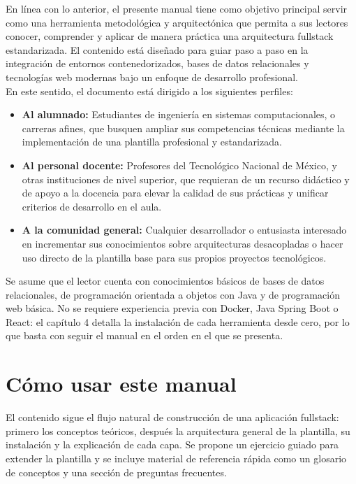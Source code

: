 	En l\'inea con lo anterior, el presente manual tiene como objetivo principal servir como una herramienta metodol\'ogica y arquitect\'onica que permita a sus lectores conocer, comprender y aplicar de manera pr\'actica una arquitectura fullstack estandarizada. El contenido est\'a diseñado para guiar paso a paso en la integraci\'on de entornos contenedorizados, bases de datos relacionales y tecnolog\'ias web modernas bajo un enfoque de desarrollo profesional.\\
	
	En este sentido, el documento est\'a dirigido a los siguientes perfiles:
	\begin{itemize}
		\item \textbf{Al alumnado:} Estudiantes de ingenier\'ia en sistemas computacionales, o carreras afines, que busquen ampliar sus competencias t\'ecnicas mediante la implementaci\'on de una plantilla profesional y estandarizada.
		\item \textbf{Al personal docente:} Profesores del Tecnol\'ogico Nacional de M\'exico, y otras instituciones de nivel superior, que requieran de un recurso did\'actico y de apoyo a la docencia para elevar la calidad de sus pr\'acticas y unificar criterios de desarrollo en el aula.
		\item \textbf{A la comunidad general:} Cualquier desarrollador o entusiasta interesado en incrementar sus conocimientos sobre arquitecturas desacopladas o hacer uso directo de la plantilla base para sus propios proyectos tecnol\'ogicos.
	\end{itemize}
	
	Se asume que el lector cuenta con conocimientos b\'asicos de bases de datos relacionales, de programaci\'on orientada a objetos con Java y  de programaci\'on web b\'asica. No se requiere experiencia previa con Docker, Java Spring Boot o React: el cap\'itulo 4 detalla la instalaci\'on de cada herramienta desde cero, por lo que basta con seguir el manual en el orden en el que se presenta.
	
	\section{C\'omo usar este manual}
	
	El contenido sigue el flujo natural de construcci\'on de una aplicaci\'on fullstack: primero los conceptos te\'oricos, despu\'es la arquitectura general de la plantilla, su instalaci\'on y la explicaci\'on de cada capa. Se propone un ejercicio guiado para extender la plantilla y se incluye material de referencia r\'apida como un glosario de conceptos y una secci\'on de preguntas frecuentes. \\
	
